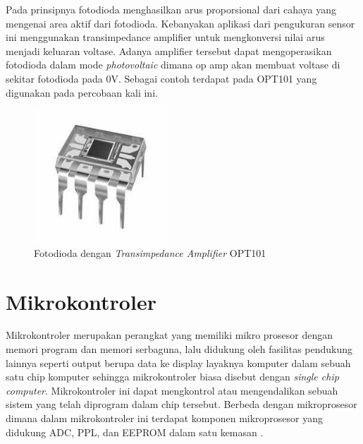 Pada prinsipnya fotodioda menghasilkan arus proporsional dari cahaya yang mengenai area aktif dari
fotodioda. Kebanyakan aplikasi dari pengukuran sensor ini menggunakan transimpedance amplifier
untuk mengkonversi nilai arus menjadi keluaran voltase. Adanya amplifier tersebut dapat
mengoperasikan fotodioda dalam mode \textit{photovoltaic} dimana op amp akan membuat voltase di
sekitar fotodioda pada 0V. Sebagai contoh terdapat pada OPT101 yang digunakan pada percobaan kali
ini.

\begin{figure}[H]
    \centering
    \includegraphics[width=5cm]{Images/OPT101.jpg}
    \caption{Fotodioda dengan \textit{Transimpedance Amplifier} OPT101}
    \label{fig:opt101}
\end{figure}



\section{Mikrokontroler}
Mikrokontroler merupakan perangkat yang memiliki mikro prosesor dengan memori program dan memori
serbaguna, lalu didukung oleh fasilitas pendukung lainnya seperti output berupa data ke display
layaknya komputer dalam sebuah satu chip komputer sehingga mikrokontroler biasa disebut dengan
\textit{single chip computer}. Mikrokontroler ini dapat mengkontrol atau mengendalikan sebuah sistem
yang telah diprogram dalam chip tersebut. Berbeda dengan mikroprosesor dimana dalam mikrokontroler
ini terdapat komponen mikroprosesor yang didukung ADC, PPL, dan EEPROM dalam satu kemasan
\cite{Sokop2016}.

